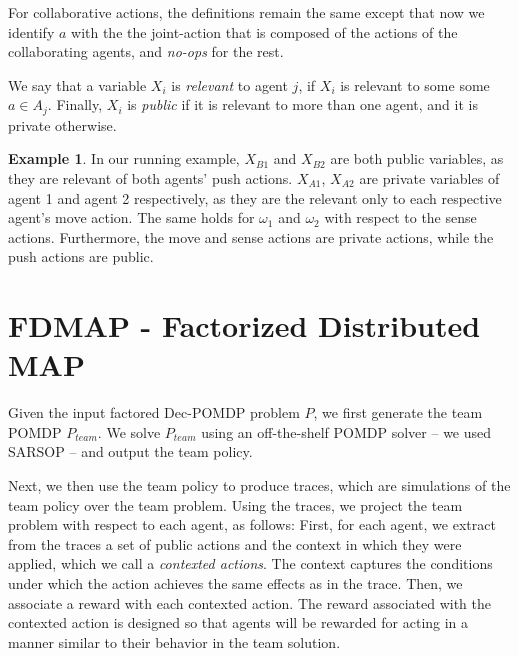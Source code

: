 \documentclass[letterpaper]{article} %
\theoremstyle{definition}
\newtheorem{example}{Example}
\newcommand{\commentout}[1]{}
\begin{document}
For collaborative actions, the definitions remain the same except that now we identify $a$ with the the joint-action that is composed of the actions of the collaborating agents, and {\em no-ops} for the rest.

We say that a variable $X_i$ is \emph{relevant} to agent $j$, if  $X_i$ is relevant to some some $a\in A_j$.
Finally, $X_i$ is \emph{public} if it is relevant to more than one agent, and it is private otherwise.

\begin{example}
In our running example, $X_{B1}$ and $X_{B2}$ are both public variables, as they are relevant of both agents' push actions.
$X_{A1}$, $X_{A2}$ are private variables of agent 1 and agent 2 respectively, as they are the relevant only to each respective agent's move action. The same holds for $\omega_1$ and $\omega_2$ with respect to the sense actions.
Furthermore, the move and sense actions are private actions, while the push actions are public.
\end{example}



\section{FDMAP - Factorized Distributed MAP}
\commentout{
We produce policy policy graphs for the agents in three steps. First, we generate a team solution using a POMDP for the centralized problem. Next, we generate single agent POMDPs in which each agent attempts to fulfill its part in the team solution. Finally, the policies obtained from the single agent POMDPs are synchronized. 

Given the input factored Dec-POMDP problem $P$, we first generate the team POMDP $P_{team}$. $P_{team}$ is identical to $P$, ignoring the underlying multi-agent structure. That is, the actions are the joint actions and the observations are the joint observation, viewed as applied 
and observed by a single agent. Equivalently, this can be viewed as a Dec-POMDP in which all observations are communicated accurately and instantaneously to all agents.}

Given the input factored Dec-POMDP problem $P$, we first generate the team POMDP $P_{team}$. We solve $P_{team}$ using an off-the-shelf POMDP solver -- we used SARSOP \cite{SARSOP} -- and output the team policy. 

Next, we then use the team policy to produce traces, which are simulations of the team policy over the team problem. Using the traces, we project the team problem with respect to each agent, as follows:
First, for each agent, we extract from the traces a set of public actions and the context in which they were applied, which we call a {\em contexted actions}. The context captures the conditions under which the action achieves the same effects as in the trace. Then, we associate a reward with each  contexted action. The reward associated with the contexted action is designed so that agents will be rewarded for acting in a manner similar to their
behavior in the team solution.
\end{document}
